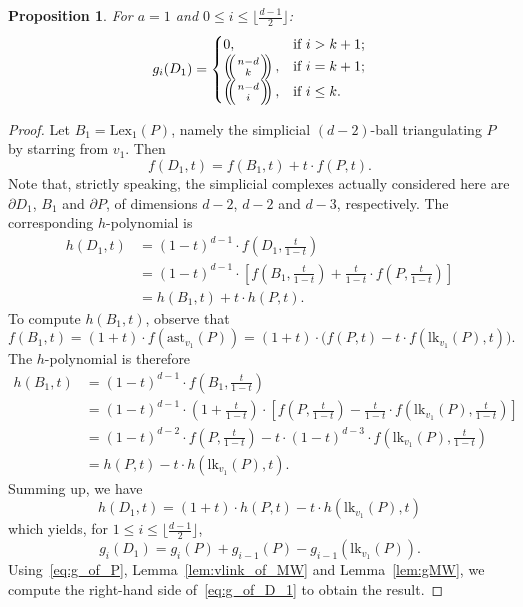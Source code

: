 \documentclass[a4paper,leqno]{article}
\newtheorem{proposition}[theorem]{Proposition}
\theoremstyle{definition}
\newcommand{\lk}{\mathrm{lk}}
\newcommand{\anst}{\mathrm{ast}}
\newcommand{\lex}{\mathrm{Lex}}
\def\mchoose#1#2{\ensuremath{\left(\kern-.3em\left(\genfrac{}{}{0pt}{}{#1}{#2}\right)\kern-.3em\right)}}
\begin{document}
\begin{proposition}\label{prop:D_1_g-vector}
For $a=1$ and $0 \leq i\leq \lfloor\frac{d-1}{2}\rfloor$:
$$g_i(D_1)=\begin{cases}
0,& \text{if } i> k+1;\\
\mchoose{n-d}{k},& \text{if } i=k+1;\\
\mchoose{n-d}{i},& \text{if } i\leq k.
\end{cases}$$
\end{proposition}
\begin{proof}
Let $B_1=\lex_1(P)$, namely the simplicial $(d-2)$-ball triangulating $P$ by starring from $v_1$. Then
$$f(D_1,t)=f(B_1,t)+t\cdot f(P,t).$$
Note that, strictly speaking, the simplicial complexes actually considered here are $\partial D_1$, $B_1$ and $\partial P$, of dimensions $d-2$, $d-2$ and $d-3$, respectively.
The corresponding $h$-polynomial is
\[
\begin{aligned}
h(D_1,t)
&= (1-t)^{d-1} \cdot f\left(D_1,\frac{t}{1-t}\right) \\
&= (1-t)^{d-1} \cdot \left[ f\left(B_1,\frac{t}{1-t}\right) + \frac{t}{1-t} \cdot f\left(P,\frac{t}{1-t}\right)\right] \\
&= h(B_1,t)+t\cdot h(P,t).
\end{aligned}
\]
To compute $h(B_1,t)$, observe that
\[
f(B_1,t)=(1+t)\cdot f(\anst_{v_1}(P))=(1+t)\cdot \Big( f(P,t)-t\cdot f(\lk_{v_1}(P),t)\Big).
\]
The $h$-polynomial is therefore
\[
\begin{aligned}
h(B_1,t)
&= (1-t)^{d-1} \cdot f\left(B_1,\frac{t}{1-t}\right) \\
&= (1-t)^{d-1} \cdot \left(1+\frac{t}{1-t}\right)\cdot \left[ f\left(P,\frac{t}{1-t}\right)-\frac{t}{1-t}\cdot f\left(\lk_{v_1}(P),\frac{t}{1-t}\right)\right]\\
&= (1-t)^{d-2}\cdot f\left(P,\frac{t}{1-t}\right)-t\cdot (1-t)^{d-3}\cdot f\left(\lk_{v_1}(P),\frac{t}{1-t}\right)\\
&= h(P,t)-t\cdot h(\lk_{v_1}(P),t).
\end{aligned}
\]
Summing up, we have
\begin{equation*}
h(D_1,t)=(1+t)\cdot h(P,t)-t\cdot h(\lk_{v_1}(P),t)
\end{equation*}
which yields, for $1\leq i\leq \lfloor\frac{d-1}{2}\rfloor$,
\begin{equation}\label{eq:g_of_D_1}
g_i(D_1)=g_i(P)+g_{i-1}(P)-g_{i-1}(\lk_{v_1}(P)).
\end{equation}
Using~\eqref{eq:g_of_P}, Lemma~\ref{lem:vlink_of_MW} and Lemma~\ref{lem:gMW}, we compute the right-hand side of~\eqref{eq:g_of_D_1} to obtain the result.
\end{proof}
\end{document}
